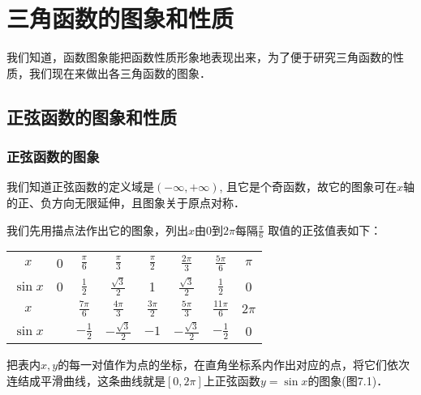 \chapter{三角函数的图象和性质}
我们知道，函数图象能把函数性质形象地表现出来，为了便于研究三角函数的性质，我们现在来做出各三角函数的图象．
\section{正弦函数的图象和性质}
\subsection{正弦函数的图象}

我们知道正弦函数的定义域是$(-\infty, +\infty)$, 且它是个奇函数，故它的图象可在$x$轴的正、负方向无限延伸，且图象关于原点对称．

我们先用描点法作出它的图象，列出$x$由0到$2\pi$每隔$\frac{\pi}{6}$
取值的正弦值表如下：

\begin{center}
\begin{tabular}{c|ccccccc}
    \hline
$x$ & 0& $\frac{\pi}{6}$& $\frac{\pi}{3}$& $\frac{\pi}{2}$& $\frac{2\pi}{3}$& $\frac{5\pi}{6}$& $\pi$\\
$\sin x$ & 0  & $\frac{1}{2}$  & $\frac{\sqrt{3}}{2}$  & 1  & $\frac{\sqrt{3}}{2}$  & $\frac{1}{2}$ & 0\\
\hline
$x$ && $\frac{7\pi}{6}$& $\frac{4\pi}{3}$& $\frac{3\pi}{2}$& $\frac{5\pi}{3}$& $\frac{11\pi}{6}$&$2\pi$\\
$\sin x$ && $-\frac{1}{2}$  & $-\frac{\sqrt{3}}{2}$  & $-1$  & $-\frac{\sqrt{3}}{2}$  & $-\frac{1}{2}$  & 0\\
\hline
\end{tabular}
\end{center}

把表内$x,y$的每一对值作为点的坐标，在直角坐标系内作出对应的点，将它们依次连结成平滑曲线，这条曲线就是$[0, 2\pi]$上正弦函数$y=\sin x$的图象(图7.1)．

